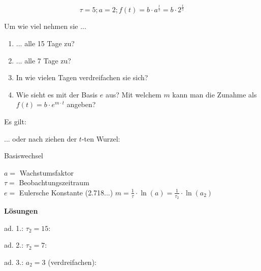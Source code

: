 $$\tau = 5; a= 2; f(t) = b\cdot{}a^\frac{t}{\tau} = b\cdot{}2^\frac{t}5$$

Um wie viel nehmen sie ...

\begin{enumerate}
\item ... alle 15 Tage zu?
\item ... alle 7 Tage zu?
\item In wie vielen Tagen verdreifachen sie sich?
\item Wie sieht es mit der Basis $e$ aus? Mit welchem $m$ kann man die
  Zunahme als $f(t) = b \cdot{} e^{m\cdot{}t}$ angeben?
\end{enumerate}

\begin{center}
  \end{center}

Es gilt:
\begin{center}
\end{center}

... oder nach ziehen der $t$-ten Wurzel:

\begin{gesetz}{Basiswechsel}{}

  \begin{center}\end{center}

 
  $a=$ Wachstumsfaktor\\
  $\tau=$ Beobachtungszeitraum\\
  $e=$ Eulersche Konstante (2.718...)
  $m=\frac1\tau\cdot{}\ln(a) = \frac1{\tau_2}\cdot{}\ln(a_2)$
\end{gesetz}
\newpage


\textbf{Lösungen}

ad. 1.: $\tau_2=15$:

ad. 2.: $\tau_2=7$:

ad. 3.: $a_2 = 3$ (verdreifachen):

